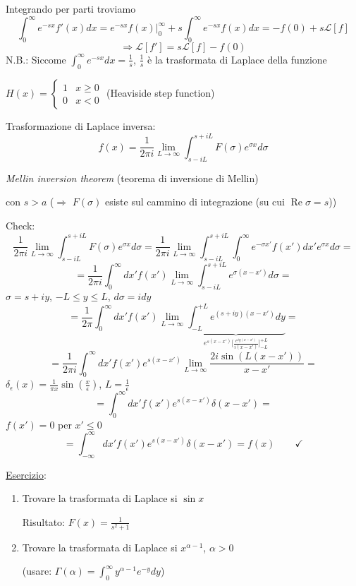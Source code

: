 \documentclass[a4paper,11pt]{report}
\begin{document}
Integrando per parti troviamo
\[
\int_0^{\infty} e^{-sx} f'(x) dx = e^{-sx} f(x)\Big|_0^\infty + s \int_0^{\infty} e^{-sx} f(x) dx = -f(0) + s\mathcal{L}[f]
\]
\begin{equation}
\Rightarrow \mathcal{L}[f'] = s\mathcal{L}[f] -f(0)
\tag{$\triangle$}
\label{eqtriangle}
\end{equation}
N.B.: Siccome $\int_0^{\infty} e^{-sx} dx = \frac{1}{s}$, $\frac{1}{s}$ \`e la trasformata di Laplace della funzione 

$H(x)=\begin{cases} 1 & x \geq 0 \\ 0 & x<0 \end{cases}$ (Heaviside step function)

\medskip

Trasformazione di Laplace inversa:
\[
f(x)=\frac{1}{2 \pi i} \lim_{L \to \infty} \int^{s+iL}_{s-iL}F(\sigma) e^{\sigma x} d\sigma
\]
\centerline{\emph{Mellin inversion theorem} (teorema di inversione di Mellin)}

con $s>a$ ($\Rightarrow$ $F(\sigma)$ esiste sul cammino di integrazione (su cui $\operatorname{Re}\sigma=s$))


\medskip

Check:
\[
\frac{1}{2 \pi i} \lim_{L \to \infty} \int^{s+iL}_{s-iL}F(\sigma) e^{\sigma x} d\sigma = \frac{1}{2 \pi i} \lim_{L \to \infty} \int^{s+iL}_{s-iL} \int_0^\infty e^{-\sigma x'} f(x') dx' e^{\sigma x} d\sigma =
\]
\[
=\frac{1}{2 \pi i} \int^\infty_0 dx' f(x') \lim_{L \to \infty} \int^{s+iL}_{s-iL} e^{\sigma (x-x')} d\sigma =
\]
$\sigma=s+iy$, $-L\leq y \leq L$, $d\sigma=i dy$
\[
=\frac{1}{2 \pi} \int^\infty_0 dx' f(x') \lim_{L \to \infty} \underbrace{\int^{+L}_{-L} e^{(s+iy)(x-x')} dy }_{e^{s(x-x')}\big[\frac{e^{iy(x-x')}}{i(x-x')}\big]^{+L}_{-L}}=
\]
\[
=\frac{1}{2 \pi i} \int^\infty_0 dx' f(x') e^{s (x-x')} \lim_{L \to \infty} \frac{2 i \sin(L(x-x'))}{x-x'}=
\]
$\delta_\epsilon(x)=\frac{1}{\pi x} \sin(\frac{x}{\epsilon})$, $L=\frac{1}{\epsilon}$
\[
=\int_0^\infty dx' f(x') e^{s (x-x')} \delta(x-x')=
\]
$f(x')=0$ per $x'\leq0$
\[
=\int_{-\infty}^\infty dx' f(x') e^{s (x-x')} \delta(x-x')=f(x) \qquad \checkmark
\]

\medskip

\underline{Esercizio}:
\begin{enumerate}
\item Trovare la trasformata di Laplace si $\sin x$

Risultato: $F(x)=\frac{1}{s^2+1}$
\item Trovare la trasformata di Laplace si $x^{\alpha -1}$, $\alpha>0$

(usare: $\Gamma(\alpha)=\int_0^{\infty} y^{\alpha -1} e^{-y} dy$)
\end{enumerate}
\end{document}
